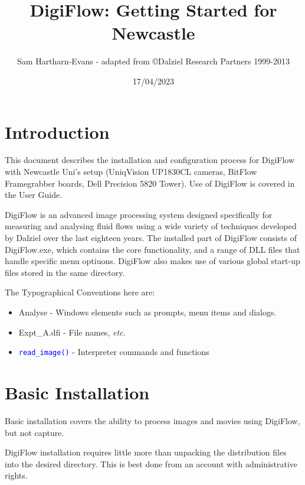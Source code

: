 \documentclass{article}
\title{DigiFlow: Getting Started for Newcastle}
\author{Sam Hartharn-Evans - adapted from \copyright Dalziel Research Partners 1999-2013}
\date{17/04/2023}
\newcommand{\Analyse}[1]{\textcolor{mygreen}{#1}}
\newcommand{\Files}[1]{\textcolor{myblue}{#1}}
\newcommand{\Interpreter}[1]{\textcolor{blue}{\texttt{#1}}}
\begin{document}
\maketitle

\vspace{-5mm} 
\tableofcontents

\section{Introduction}
This document describes the installation and configuration process for DigiFlow with Newcastle Uni's setup (UniqVision UP1830CL cameras, BitFlow Framegrabber boards, Dell Precision 5820 Tower). Use of DigiFlow is covered in the User Guide. 

DigiFlow is an advanced image processing system designed specifically for measuring and analysing fluid flows using a wide variety of techniques developed by Dalziel over the last eighteen years. The installed part of DigiFlow consists of \Analyse{DigiFlow.exe}, which contains the core functionality, and a range of DLL files that handle specific menu optiuons. DigiFlow also makes use of various global start-up files stored in the same directory. 

The Typographical Conventions here are:
\begin{itemize}
\item \Analyse{Analyse} - Windows elements such as prompts, menu items and dialogs.  
\item \Files{Expt\_A.dfi} - File names, \textit{etc.} 
\item \Interpreter{read\_image()} - Interpreter commands and functions
\end{itemize}

\section{Basic Installation} \label{sec:BasicInstallation}

Basic installation covers the ability to process images and movies using DigiFlow, but not capture. 

DigiFlow installation requires little more than unpacking the distribution files into the desired directory. This is best done from an account with administrative rights. 
\end{document}
